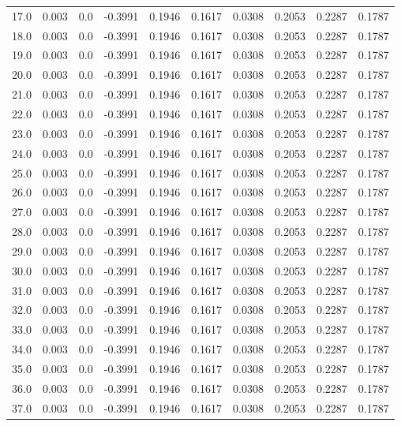 \begin{longtable}{lrrrrrrrrr}
17.0 & 0.003 & 0.0 & -0.3991 & 0.1946 & 0.1617 & 0.0308 & 0.2053 & 0.2287 & 0.1787 \\
18.0 & 0.003 & 0.0 & -0.3991 & 0.1946 & 0.1617 & 0.0308 & 0.2053 & 0.2287 & 0.1787 \\
19.0 & 0.003 & 0.0 & -0.3991 & 0.1946 & 0.1617 & 0.0308 & 0.2053 & 0.2287 & 0.1787 \\
20.0 & 0.003 & 0.0 & -0.3991 & 0.1946 & 0.1617 & 0.0308 & 0.2053 & 0.2287 & 0.1787 \\
21.0 & 0.003 & 0.0 & -0.3991 & 0.1946 & 0.1617 & 0.0308 & 0.2053 & 0.2287 & 0.1787 \\
22.0 & 0.003 & 0.0 & -0.3991 & 0.1946 & 0.1617 & 0.0308 & 0.2053 & 0.2287 & 0.1787 \\
23.0 & 0.003 & 0.0 & -0.3991 & 0.1946 & 0.1617 & 0.0308 & 0.2053 & 0.2287 & 0.1787 \\
24.0 & 0.003 & 0.0 & -0.3991 & 0.1946 & 0.1617 & 0.0308 & 0.2053 & 0.2287 & 0.1787 \\
25.0 & 0.003 & 0.0 & -0.3991 & 0.1946 & 0.1617 & 0.0308 & 0.2053 & 0.2287 & 0.1787 \\
26.0 & 0.003 & 0.0 & -0.3991 & 0.1946 & 0.1617 & 0.0308 & 0.2053 & 0.2287 & 0.1787 \\
27.0 & 0.003 & 0.0 & -0.3991 & 0.1946 & 0.1617 & 0.0308 & 0.2053 & 0.2287 & 0.1787 \\
28.0 & 0.003 & 0.0 & -0.3991 & 0.1946 & 0.1617 & 0.0308 & 0.2053 & 0.2287 & 0.1787 \\
29.0 & 0.003 & 0.0 & -0.3991 & 0.1946 & 0.1617 & 0.0308 & 0.2053 & 0.2287 & 0.1787 \\
30.0 & 0.003 & 0.0 & -0.3991 & 0.1946 & 0.1617 & 0.0308 & 0.2053 & 0.2287 & 0.1787 \\
31.0 & 0.003 & 0.0 & -0.3991 & 0.1946 & 0.1617 & 0.0308 & 0.2053 & 0.2287 & 0.1787 \\
32.0 & 0.003 & 0.0 & -0.3991 & 0.1946 & 0.1617 & 0.0308 & 0.2053 & 0.2287 & 0.1787 \\
33.0 & 0.003 & 0.0 & -0.3991 & 0.1946 & 0.1617 & 0.0308 & 0.2053 & 0.2287 & 0.1787 \\
34.0 & 0.003 & 0.0 & -0.3991 & 0.1946 & 0.1617 & 0.0308 & 0.2053 & 0.2287 & 0.1787 \\
35.0 & 0.003 & 0.0 & -0.3991 & 0.1946 & 0.1617 & 0.0308 & 0.2053 & 0.2287 & 0.1787 \\
36.0 & 0.003 & 0.0 & -0.3991 & 0.1946 & 0.1617 & 0.0308 & 0.2053 & 0.2287 & 0.1787 \\
37.0 & 0.003 & 0.0 & -0.3991 & 0.1946 & 0.1617 & 0.0308 & 0.2053 & 0.2287 & 0.1787 \\

\end{longtable}
